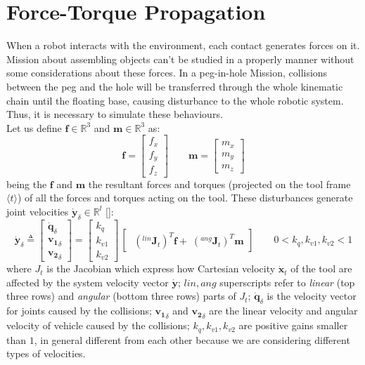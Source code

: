 \section{Force-Torque Propagation}
\label{sec:forceConsideration}
When a robot interacts with the environment, each contact generates forces on it. Mission about assembling objects can't be studied in a properly manner without some considerations about these forces. In a peg-in-hole Mission, collisions between the peg and the hole will be transferred through the whole kinematic chain until the floating base, causing disturbance to the whole robotic system. Thus, it is necessary to simulate these behaviours.\\ 

Let us define $\boldsymbol{f} \in \mathbb{R}^3$ and $\boldsymbol{m} \in \mathbb{R}^3$ as:
\begin{equation}
\boldsymbol{f} = \begin{bmatrix}f_x \\ f_y \\ f_z\end{bmatrix} \qquad
\boldsymbol{m} = \begin{bmatrix}m_x \\ m_y \\ m_z\end{bmatrix}
\end{equation}
being the $\boldsymbol{f}$ and $\boldsymbol{m}$ the resultant forces and torques (projected on the tool frame $ \langle t \rangle $) of all the forces and torques acting on the tool. These disturbances generate joint velocities $ \dot{\boldsymbol{y}}_{\delta} \in \mathbb{R}^l$ [\cite{bookSiciliano}]:
\begin{equation}
	\label{eq:forTor}
	\dot{\boldsymbol{y}}_{\delta} \triangleq 
	\begin{bmatrix} \dot{\boldsymbol{q}}_{\delta} \\ \boldsymbol{v_1}_{\delta} \\ \boldsymbol{v_2}_{\delta} \end{bmatrix}
	= \begin{bmatrix} k_q \\ k_{v1} \\ k_{v2} \end{bmatrix} \, \begin{bmatrix}\;(^{lin}\boldsymbol{J}_t)^T \boldsymbol{f} + \;(^{ang}\boldsymbol{J}_t)^T \boldsymbol{m}\end{bmatrix} 
	\qquad 0 < k_q, k_{v1}, k_{v2} < 1 
\end{equation}
where $J_t$ is the Jacobian which express how Cartesian velocity $\dot{\boldsymbol{x}}_t$ of the tool are affected by the system velocity vector  $\dot{\boldsymbol{y}}$; $lin, ang$ superscripts refer to \textit{linear} (top three rows) and \textit{angular} (bottom three rows) parts of $J_t$; $\dot{\boldsymbol{q}}_{\delta}$ is the velocity vector for joints caused by the collisions; $\boldsymbol{v_1}_{\delta}$ and $\boldsymbol{v_2}_{\delta}$  are the linear velocity and angular velocity of vehicle caused by the collisions; $k_q, k_{v1}, k_{v2}$ are positive gains smaller than $1$, in general different from each other  because we are considering different types of velocities.\\


